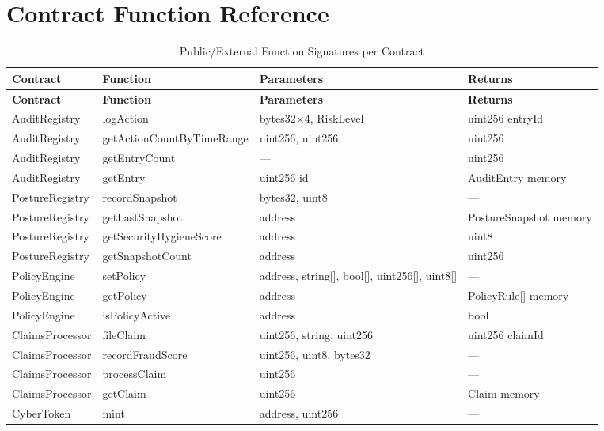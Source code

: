 \documentclass[12pt,a4paper]{article}
\begin{document}
\appendix

\section{Contract Function Reference}
\label{app:functions}

\begin{longtable}{@{}llp{5cm}p{3cm}@{}}
\caption{Public/External Function Signatures per Contract}
\label{tab:functions}\\
\toprule
\rowcolor{gray!15}
\textbf{Contract} & \textbf{Function} & \textbf{Parameters} & \textbf{Returns} \\
\midrule
\endfirsthead
\toprule
\rowcolor{gray!15}
\textbf{Contract} & \textbf{Function} & \textbf{Parameters} & \textbf{Returns} \\
\midrule
\endhead
AuditRegistry & logAction & bytes32$\times$4, RiskLevel & uint256 entryId \\
AuditRegistry & getActionCountByTimeRange & uint256, uint256 & uint256 \\
AuditRegistry & getEntryCount & --- & uint256 \\
AuditRegistry & getEntry & uint256 id & AuditEntry memory \\
\midrule
PostureRegistry & recordSnapshot & bytes32, uint8 & --- \\
PostureRegistry & getLastSnapshot & address & PostureSnapshot memory \\
PostureRegistry & getSecurityHygieneScore & address & uint8 \\
PostureRegistry & getSnapshotCount & address & uint256 \\
\midrule
PolicyEngine & setPolicy & address, string[], bool[], uint256[], uint8[] & --- \\
PolicyEngine & getPolicy & address & PolicyRule[] memory \\
PolicyEngine & isPolicyActive & address & bool \\
\midrule
ClaimsProcessor & fileClaim & uint256, string, uint256 & uint256 claimId \\
ClaimsProcessor & recordFraudScore & uint256, uint8, bytes32 & --- \\
ClaimsProcessor & processClaim & uint256 & --- \\
ClaimsProcessor & getClaim & uint256 & Claim memory \\
\midrule
CyberToken & mint & address, uint256 & --- \\

\end{longtable}
\end{document}
